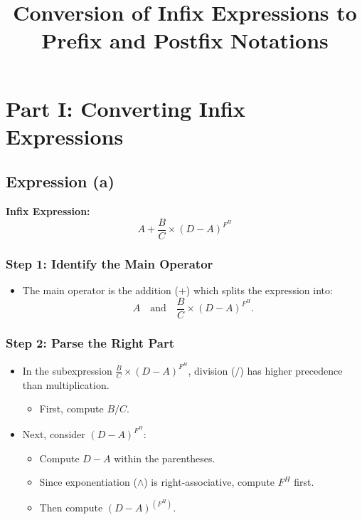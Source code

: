 \documentclass[12pt]{article}
\title{Conversion of Infix Expressions to Prefix and Postfix Notations}
\author{}
\date{}
\begin{document}
\maketitle

\section*{Part I: Converting Infix Expressions}

\subsection*{Expression (a)}
\textbf{Infix Expression:}
\[
    A + \frac{B}{C} \times (D - A)^{F^{H}}
\]

\subsubsection*{Step 1: Identify the Main Operator}
\begin{itemize}[label=$\bullet$]
    \item The main operator is the addition ($+$) which splits the expression into:
          \[
              A \quad \text{and} \quad \frac{B}{C} \times (D - A)^{F^{H}}.
          \]
\end{itemize}

\subsubsection*{Step 2: Parse the Right Part}
\begin{itemize}[label=$\bullet$]
    \item In the subexpression $\frac{B}{C} \times (D - A)^{F^{H}}$, division ($/$) has higher precedence than multiplication.
          \begin{itemize}[label=$\circ$]
              \item First, compute $B/C$.
          \end{itemize}
    \item Next, consider $(D - A)^{F^{H}}$:
          \begin{itemize}[label=$\circ$]
              \item Compute $D-A$ within the parentheses.
              \item Since exponentiation ($\wedge$) is right-associative, compute $F^H$ first.
              \item Then compute $(D-A)^{(F^H)}$.
          \end{itemize}
\end{itemize}
\end{document}
